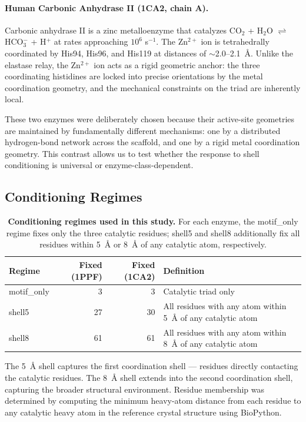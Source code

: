 \documentclass[11pt,letterpaper]{article}
\begin{document}
\paragraph{Human Carbonic Anhydrase II (1CA2, chain A).} Carbonic anhydrase II is a zinc metalloenzyme \cite{hakansson1992} that catalyzes CO$_2$ + H$_2$O $\rightleftharpoons$ HCO$_3^-$ + H$^+$ at rates approaching $10^6$ s$^{-1}$. The Zn$^{2+}$ ion is tetrahedrally coordinated by His94, His96, and His119 at distances of $\sim$2.0--2.1~\AA{}. Unlike the elastase relay, the Zn$^{2+}$ ion acts as a rigid geometric anchor: the three coordinating histidines are locked into precise orientations by the metal coordination geometry, and the mechanical constraints on the triad are inherently local.

These two enzymes were deliberately chosen because their active-site geometries are maintained by fundamentally different mechanisms: one by a distributed hydrogen-bond network across the scaffold, and one by a rigid metal coordination geometry. This contrast allows us to test whether the response to shell conditioning is universal or enzyme-class-dependent.

\subsection{Conditioning Regimes}

\begin{table}[h]
\centering
\caption{\textbf{Conditioning regimes used in this study.} For each enzyme, the motif\_only regime fixes only the three catalytic residues; shell5 and shell8 additionally fix all residues within 5~\AA{} or 8~\AA{} of any catalytic atom, respectively.}
\label{tab:regimes}
\begin{tabular}{lrrp{5cm}}
\toprule
Regime & Fixed (1PPF) & Fixed (1CA2) & Definition \\
\midrule
motif\_only & 3  & 3  & Catalytic triad only \\
shell5      & 27 & 30 & All residues with any atom within 5~\AA{} of any catalytic atom \\
shell8      & 61 & 61 & All residues with any atom within 8~\AA{} of any catalytic atom \\
\bottomrule
\end{tabular}
\end{table}

The 5~\AA{} shell captures the first coordination shell — residues directly contacting the catalytic residues. The 8~\AA{} shell extends into the second coordination shell, capturing the broader structural environment. Residue membership was determined by computing the minimum heavy-atom distance from each residue to any catalytic heavy atom in the reference crystal structure using BioPython.
\end{document}
